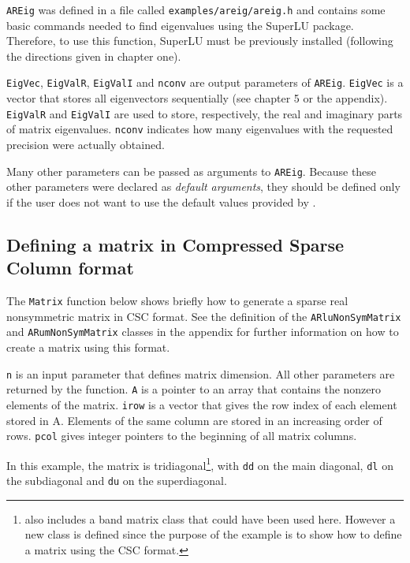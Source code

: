 \texttt{AREig} was defined in a file called \texttt{examples/areig/areig.h} and contains some basic \ARPP{} commands needed to find eigenvalues using the SuperLU package. Therefore, to use this function, SuperLU must be previously installed (following the directions given in chapter one).

\texttt{EigVec}, \texttt{EigValR}, \texttt{EigValI} and \texttt{nconv} are output parameters of \texttt{AREig}. \texttt{EigVec} is a vector that stores all eigenvectors sequentially (see chapter 5 or the appendix). \texttt{EigValR} and \texttt{EigValI} are used to store, respectively, the real and imaginary parts of matrix eigenvalues. \texttt{nconv} indicates how many eigenvalues with the requested precision were actually obtained.

Many other \ARPP{} parameters can be passed as arguments to \texttt{AREig}. Because these other parameters were declared as \textit{default arguments}, they should be defined only if the user does not want to use the default values provided by \ARPP{}. 

\subsection{Defining a matrix in Compressed Sparse Column format}

The \texttt{Matrix} function below shows briefly how to generate a sparse real nonsymmetric matrix in CSC format. See the definition of the \texttt{ARluNonSymMatrix} and \texttt{ARumNonSymMatrix} classes in the appendix for further information on how to create a matrix using this format.

\texttt{n} is an input parameter that defines matrix dimension. All other parameters are returned by the function. \texttt{A} is a pointer to an array that contains the nonzero elements of the matrix. \texttt{irow} is a vector that gives the row index of each element stored in A. Elements of the same column are stored in an increasing order of rows. \texttt{pcol} gives integer pointers to the beginning of all matrix columns.

In this example, the matrix is tridiagonal\footnote{\ARPP{} also includes a band matrix class that could have been used here. However a new class is defined since the purpose of the example is to show how to define a matrix using the CSC format.}, with \texttt{dd} on the main diagonal, \texttt{dl} on the subdiagonal and \texttt{du} on the superdiagonal.

